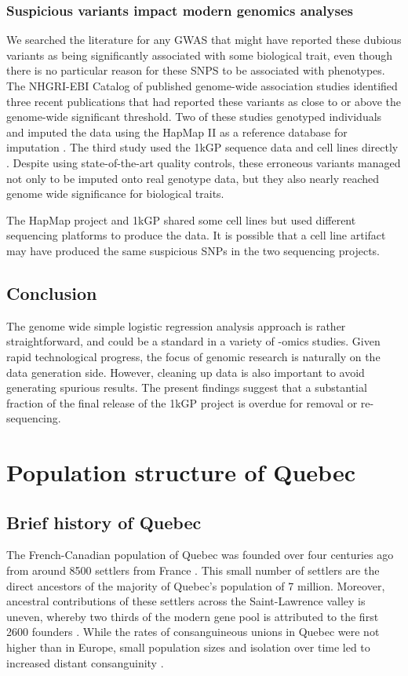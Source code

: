 \documentclass[
11pt, %
oneside, %
english, %
doublespacing, %
headsepline, %
chapterinoneline, %
]{MastersDoctoralThesis} %
\begin{document}
\subsection{Suspicious variants impact modern genomics analyses}
We searched the literature for any GWAS that might have reported these dubious variants as being significantly associated with some biological trait, even though there is no particular reason for these SNPS to be associated with phenotypes.
The NHGRI-EBI Catalog of published genome-wide association studies identified three recent publications that had reported these variants as close to or above the genome-wide significant threshold.
Two of these studies genotyped individuals and imputed the data using the HapMap II as a reference  database for imputation \citep{Kraja2011, Ebejer2013}.
The third study used the 1kGP sequence data and cell lines directly \citep{Mandage2017}.
Despite using state-of-the-art quality controls, these erroneous variants managed not only to be imputed onto real genotype data, but they also nearly reached genome wide significance for biological traits.

The HapMap project and 1kGP shared some cell lines but used different sequencing platforms to produce the data.
It is possible that a cell line artifact may have produced the same suspicious SNPs in the two sequencing projects.

\section{Conclusion}
The genome wide simple logistic regression analysis approach is rather straightforward, and could be a standard in a variety of -omics studies.
Given rapid technological progress, the focus of genomic research is naturally on the data generation side. 
However, cleaning up data is also important to avoid generating spurious results. 
The present findings suggest that a substantial fraction of the final release of the 1kGP project is overdue for removal or re-sequencing. 
\vfill

\chapter{Population structure of Quebec}

\section{Brief history of Quebec}
The French-Canadian population of Quebec was founded over four centuries ago from around 8500 settlers from France \citep{Bherer2011,Laberge2005}.
This small number of settlers are the direct ancestors of the majority of Quebec's population of 7 million.
Moreover, ancestral contributions of these settlers across the Saint-Lawrence valley is uneven, whereby two thirds of the modern gene pool is attributed to the first 2600 founders \citep{Gagnon2001, Laberge2005}.
While the rates of consanguineous unions in Quebec were not higher than in Europe, small population sizes and isolation over time led to increased distant consanguinity \citep{Laberge2005}.
\end{document}
